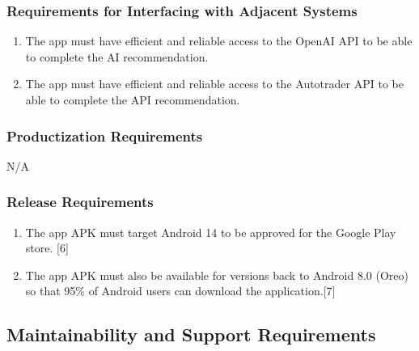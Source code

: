 \documentclass[]{article}
\begin{document}
\subsubsection{Requirements for Interfacing with Adjacent Systems}
\label{ssub:interfacing_adjacent_systems}
\begin{enumerate}[{OE-RIAS}1.]
    \item The app must have efficient and reliable access to the OpenAI API to be able to complete the AI recommendation. 
    \item The app must have efficient and reliable access to the Autotrader API to be able to complete the API recommendation.
\end{enumerate}

\subsubsection{Productization Requirements}
\label{ssub:productization_requirements}
N/A

\subsubsection{Release Requirements}
\label{ssub:release_requirements}
\begin{enumerate}[{OE-RR}1.]
    \item The app APK must target Android 14 to be approved for the Google Play store. [6]
    \item The app APK must also be available for versions back to Android 8.0 (Oreo) so that 95\% of Android users can download the application.[7]
\end{enumerate}

\subsection{Maintainability and Support Requirements}
\label{sub:maintainability_and_support_requirements}
\end{document}
